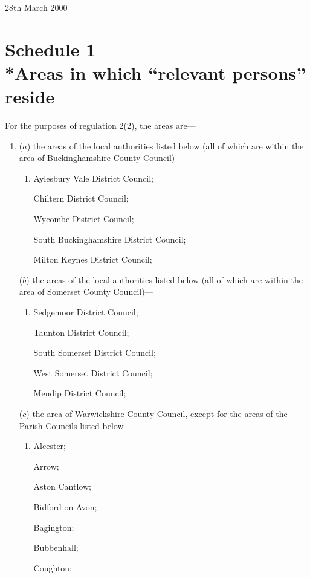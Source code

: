 \documentclass[12pt,a4paper]{article}
\begin{document}
28th March 2000

\small

\part[Schedule 1 --- Areas in which “relevant persons” reside]{Schedule 1\\*Areas in which ``relevant persons'' reside}

\renewcommand\parthead{--- Schedule 1}

For the purposes of regulation 2(2), the areas are—
\begin{enumerate}\item[]
($a$) the areas of the local authorities listed below (all of which are within the area of Buckinghamshire County Council)—
\begin{enumerate}\item[]
    Aylesbury Vale District Council;

    Chiltern District Council;

    Wycombe District Council;

    South Buckinghamshire District Council;

    Milton Keynes District Council; 
\end{enumerate}

($b$) the areas of the local authorities listed below (all of which are within the area of Somerset County Council)—
\begin{enumerate}\item[]
    Sedgemoor District Council;

    Taunton District Council;

    South Somerset District Council;

    West Somerset District Council;

    Mendip District Council; 
\end{enumerate}

($c$) the area of Warwickshire County Council, except for the areas of the Parish Councils listed below—
\begin{enumerate}\item[]
    Alcester;

    Arrow;

    Aston Cantlow;

    Bidford on Avon;

    Bagington;

    Bubbenhall;

    Coughton;


\end{enumerate}
\end{enumerate}
\end{document}
